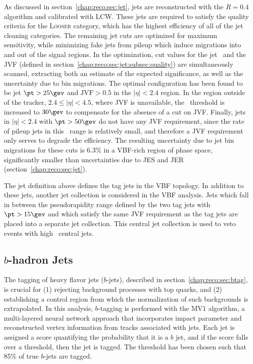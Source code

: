 As discussed in section~\ref{chap:reco:sec:jet}, jets are
reconstructed with the \antikt $R=0.4$ algorithm and calibrated with
LCW. These jets are required to satisfy the quality criteria for the
L\textsc{ooser} category, which has the highest efficiency of all of
the jet cleaning categories. The remaining jet cuts are optimized for
maximum sensitivity, while minimizing fake jets from pileup which
induce migrations into and out of the signal regions. In the
optimization, cut values for the jet \pt~and the JVF (defined in
section~\ref{chap:reco:sec:jet:subsec:quality}) are simultaneously
scanned, extracting both an estimate of the expected significance, as
well as the uncertainty due to bin migrations. The optimal
configuration has been found to be jet $\pt > 25 \gev$ and
$\textrm{JVF} > 0.5$ in the $|\eta| < 2.4$ region. In the region
outside of the tracker, $2.4 \leq |\eta| < 4.5$, where JVF is
unavailable, the \pt~threshold is increased to $30 \gev$ to compensate
for the absence of a cut on JVF. Finally, jets in $|\eta| < 2.4$ with
$\pt > 50 \gev$ do not have any JVF requirement, since the rate of
pileup jets in this \pt~range is relatively small, and therefore a JVF
requirement only serves to degrade the efficiency. The resulting
uncertainty due to jet bin migrations for these cuts is 6.3\% in a
VBF-rich region of phase space, significantly smaller than
uncertainties due to JES and JER (section~\ref{chap:reco:sec:jet}). 

The jet definition above defines the tag jets in the VBF topology. In
addition to these jets, another jet collection is considered in the
VBF analysis. Jets which fall in between the pseudorapidity range
defined by the two tag jets with $\pt > 15 \gev$ and which satisfy the
same JVF requirement as the tag jets are placed into a separate jet
collection. This central jet collection is used to veto events with
high \pt~central jets.

\subsection{$b$-hadron Jets}
\label{chap:analysis:sec:objects:subsec:btag}

The tagging of heavy flavor jets ($b$-jets), described in
section~\ref{chap:reco:sec:btag}, is crucial for (1) rejecting
background processes with top quarks, and (2) establishing a control
region from which the normalization of such backgrounds is
extrapolated. In this analysis, $b$-tagging is performed with the MV1
algorithm, a multi-layered neural network approach that incorporates
impact parameter and reconstructed vertex information from tracks
associated with jets. Each jet is assigned a score quantifying the
probability that it is a $b$ jet, and if the score falls over a
threshold, then the jet is tagged. The threshold
has been chosen such that 85\% of true $b$-jets are tagged. 

